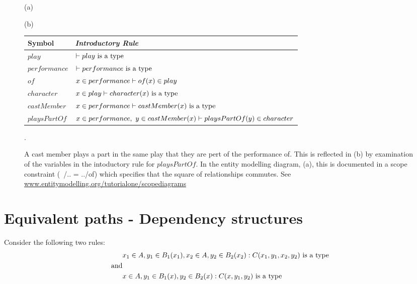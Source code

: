 \documentclass[10pt,a4paper]{article}
\begin{document}
\begin{center}
\begin{figure} [H]
(a) 

(b)
\begin{minipage}[c]{0.6 \textwidth}
\begin{tabular}{l l}
Symbol & \itshape{Introductory Rule} \\ 
\hline 
$play$ &$\vdash play\mbox{ is a type} $\\
$performance$ &$\vdash performance\mbox{ is a type} $\\
$of       $& $ x \in performance \vdash of(x) \in play$ \\
$character$&$x \in play \vdash character(x) \mbox{ is a type} $\\
$castMember$&$x \in performance \vdash castMember(x) \mbox{ is a type}$ \\
$playsPartOf$& $ x \in performance ,\ y \in castMember(x) \vdash playsPartOf(y) \in character $\\
\end{tabular}
\end{minipage}
\caption{A cast member plays a part in the same play that they are pert of the performance of. This is reflected in (b) by examination of the variables in the intoductory rule for $playsPartOf$. In the entity modelling diagram, (a), this is documented in a scope constraint (~/.. = ../of)  which specifies that the square of relationships commutes. See \href{http://www.entitymodelling.org/tutorialone/scopediagrams.html}
{www.entitymodelling.org/tutorialone/scopediagrams}}.
\label{citizen}
\end{figure}
\end{center}









\section{Equivalent paths - Dependency structures}

Consider the following two rules:
\begin{subequations}
\begin{align} 
           & x_1 \in A, y_1 \in B_1(x_1), x_2 \in A, y_2 \in B_2(x_2) : C(x_1,y_1,x_2,y_2) \mbox{ is a type}\label{multipleInstanceA}\\
\mbox{and}& \notag \\
           & x \in A, y_1 \in B_1(x), y_2 \in B_2(x) : C(x,y_1,y_2) \mbox{ is a type} \label{singleInstanceA}
\end{align}
\end{subequations}
\end{document}
